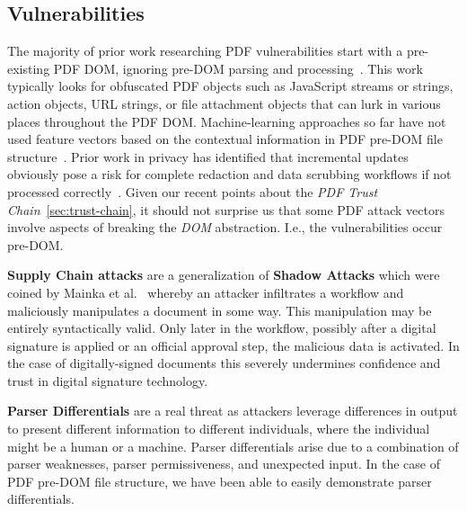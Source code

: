 \subsection{Vulnerabilities}
\label{sec:vulnerabilities}


The majority of prior work researching PDF vulnerabilities start with a pre-existing PDF DOM,
ignoring pre-DOM parsing and processing~\cite{smutzMaliciousPDFDetection2012,liuDetectingMaliciousJavascript2014,iwamotoStudyMaliciousPDF2016}. 
This work typically looks for obfuscated PDF objects such as
JavaScript streams or strings, action objects, URL strings, or file attachment objects that 
can lurk in various places throughout the PDF DOM. Machine-learning approaches so far have not  
used feature vectors based on the contextual information in PDF pre-DOM file structure~\cite{andrewmangleAnalysisMachineLearning2021,manharmohammedHAPSSAHolisticApproach2021}. 
Prior work in privacy has identified that incremental updates obviously pose a risk for complete
redaction and data scrubbing workflows if not processed correctly~\cite{adhataraoHowArePDF2021,y.fengSystematicMethodPDF2018}.
Given our recent points about the \emph{PDF Trust Chain}~\cref{sec:trust-chain}, it should not 
surprise us that some PDF attack vectors involve aspects of breaking the \emph{DOM} abstraction.
I.e., the vulnerabilities occur pre-DOM.

{\bf{Supply Chain attacks}} are a generalization of {\bf{Shadow Attacks}} which were coined by Mainka 
et al.~\cite{mainkaShadowAttacksHiding2021} whereby an attacker infiltrates a workflow and 
maliciously manipulates a document in some way. This manipulation may be entirely syntactically valid.
Only later in the workflow, possibly after a 
digital signature is applied or an official approval step, the malicious data is 
activated. In the case of digitally-signed documents this severely undermines confidence and trust
in digital signature technology.

{\bf{Parser Differentials}} are a real threat as attackers leverage differences in output
to present different information to different individuals, where the individual might be a human
or a machine. Parser differentials arise due to a combination of parser weaknesses, 
parser permissiveness, and unexpected input. In the case of PDF pre-DOM file structure, we have been
able to easily demonstrate parser differentials.

